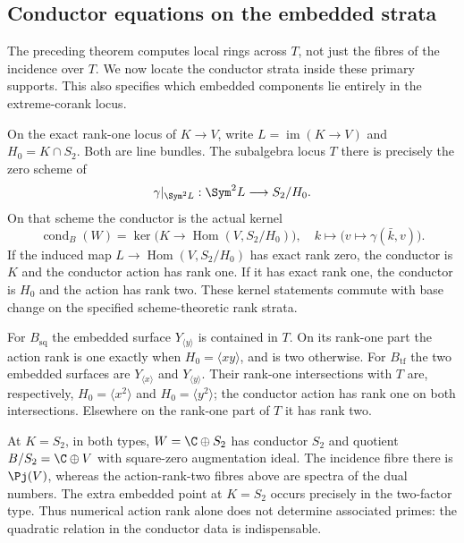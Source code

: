 \subsection{Conductor equations on the embedded strata}
The preceding theorem computes local rings across $T$, not just the
fibres of the incidence over $T$. We now locate the conductor strata
inside these primary supports. This also specifies which embedded
components lie entirely in the extreme-corank locus.

\begin{theorem}
\label{thm:loewy-conductor-boundary}
On the exact rank-one locus of $K\to V$, write
$L=\operatorname{im}(K\to V)$ and $H_0=K\cap S_2$.
Both are line bundles. The subalgebra locus $T$ there is precisely
the zero scheme of
\begin{equation}\label{eq:loewy-subalgebra-equation}
 \gamma|_{\Sym^2L}:\Sym^2L\longrightarrow S_2/H_0.
\end{equation}
On that scheme the conductor is the actual kernel
\begin{equation}\label{eq:loewy-conductor-kernel}
 \operatorname{cond}_B(W)=
 \ker\bigl(K\longrightarrow
         \operatorname{Hom}(V,S_2/H_0)\bigr),
 \quad k\longmapsto\bigl(v\longmapsto\gamma(\bar k,v)\bigr).
\end{equation}
If the induced map $L\to\operatorname{Hom}(V,S_2/H_0)$ has exact
rank zero, the conductor is $K$ and the conductor action has rank
one. If it has exact rank one, the conductor is $H_0$ and the action
has rank two. These kernel statements commute with base change on
the specified scheme-theoretic rank strata.

For $B_{\mathrm{sq}}$ the embedded surface $Y_{\langle y\rangle}$
is contained in $T$. On its rank-one part the action rank is one
exactly when $H_0=\langle xy\rangle$, and is two otherwise.
For $B_{\mathrm{tf}}$ the two embedded surfaces are
$Y_{\langle x\rangle}$ and $Y_{\langle y\rangle}$.
Their rank-one intersections with $T$ are, respectively,
$H_0=\langle x^2\rangle$ and $H_0=\langle y^2\rangle$;
the conductor action has rank one on both intersections.
Elsewhere on the rank-one part of $T$ it has rank two.

At $K=S_2$, in both types, $W=\C\oplus S_2$ has conductor $S_2$
and quotient $B/S_2=\C\oplus V$ with square-zero augmentation ideal.
The incidence fibre there is $\Pj(V)$, whereas the action-rank-two
fibres above are spectra of the dual numbers. The extra embedded
point at $K=S_2$ occurs precisely in the two-factor type.
Thus numerical action rank alone does not determine associated primes:
the quadratic relation in the conductor data is indispensable.
\end{theorem}
